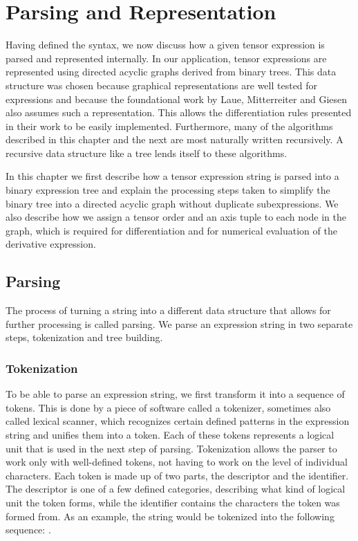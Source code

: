 \documentclass[12pt, a4paper]{report} %
\begin{document}
\chapter{Parsing and Representation}
Having defined the syntax, we now discuss how a given tensor expression is parsed and represented internally.
In our application, tensor expressions are represented using directed acyclic graphs derived from binary trees.
This data structure was chosen because graphical representations are well tested for expressions and because the foundational work \cite{tensorpaper} by Laue, Mitterreiter and Giesen also assumes such a representation.
This allows the differentiation rules presented in their work to be easily implemented.
Furthermore, many of the algorithms described in this chapter and the next are most naturally written recursively.
A recursive data structure like a tree lends itself to these algorithms.

In this chapter we first describe how a tensor expression string is parsed into a binary expression tree and explain the processing steps taken to simplify the binary tree into a directed acyclic graph without duplicate subexpressions.
We also describe how we assign a tensor order and an axis tuple to each node in the graph, which is required for differentiation and for numerical evaluation of the derivative expression.

\section{Parsing}
The process of turning a string into a different data structure that allows for further processing is called parsing.
We parse an expression string in two separate steps, tokenization and tree building.

\subsection{Tokenization}
To be able to parse an expression string, we first transform it into a sequence of tokens.
This is done by a piece of software called a tokenizer, sometimes also called lexical scanner, which recognizes certain defined patterns in the expression string and unifies them into a token.
Each of these tokens represents a logical unit that is used in the next step of parsing.
Tokenization allows the parser to work only with well-defined tokens, not having to work on the level of individual characters.
Each token is made up of two parts, the descriptor and the identifier.
The descriptor is one of a few defined categories, describing what kind of logical unit the token forms, while the identifier contains the characters the token was formed from.
As an example, the string  would be tokenized into the following sequence: .
\end{document}
